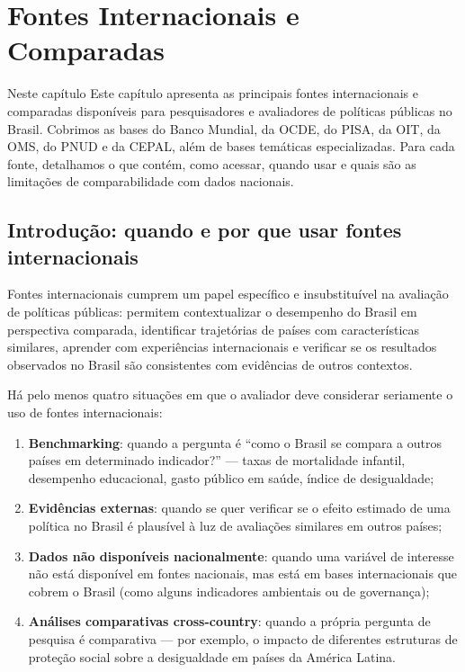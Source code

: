 
\chapter{Fontes Internacionais e Comparadas}

\begin{boxdestaque}{Neste capítulo}
Este capítulo apresenta as principais fontes internacionais e comparadas disponíveis para pesquisadores e avaliadores de políticas públicas no Brasil. Cobrimos as bases do Banco Mundial, da OCDE, do PISA, da OIT, da OMS, do PNUD e da CEPAL, além de bases temáticas especializadas. Para cada fonte, detalhamos o que contém, como acessar, quando usar e quais são as limitações de comparabilidade com dados nacionais.
\end{boxdestaque}

\section{Introdução: quando e por que usar fontes internacionais}

Fontes internacionais cumprem um papel específico e insubstituível na avaliação de políticas públicas: permitem contextualizar o desempenho do Brasil em perspectiva comparada, identificar trajetórias de países com características similares, aprender com experiências internacionais e verificar se os resultados observados no Brasil são consistentes com evidências de outros contextos.

Há pelo menos quatro situações em que o avaliador deve considerar seriamente o uso de fontes internacionais:

\begin{enumerate}
  \item \textbf{Benchmarking}: quando a pergunta é ``como o Brasil se compara a outros países em determinado indicador?'' --- taxas de mortalidade infantil, desempenho educacional, gasto público em saúde, índice de desigualdade;
  \item \textbf{Evidências externas}: quando se quer verificar se o efeito estimado de uma política no Brasil é plausível à luz de avaliações similares em outros países;
  \item \textbf{Dados não disponíveis nacionalmente}: quando uma variável de interesse não está disponível em fontes nacionais, mas está em bases internacionais que cobrem o Brasil (como alguns indicadores ambientais ou de governança);
  \item \textbf{Análises comparativas cross-country}: quando a própria pergunta de pesquisa é comparativa --- por exemplo, o impacto de diferentes estruturas de proteção social sobre a desigualdade em países da América Latina.
\end{enumerate}

